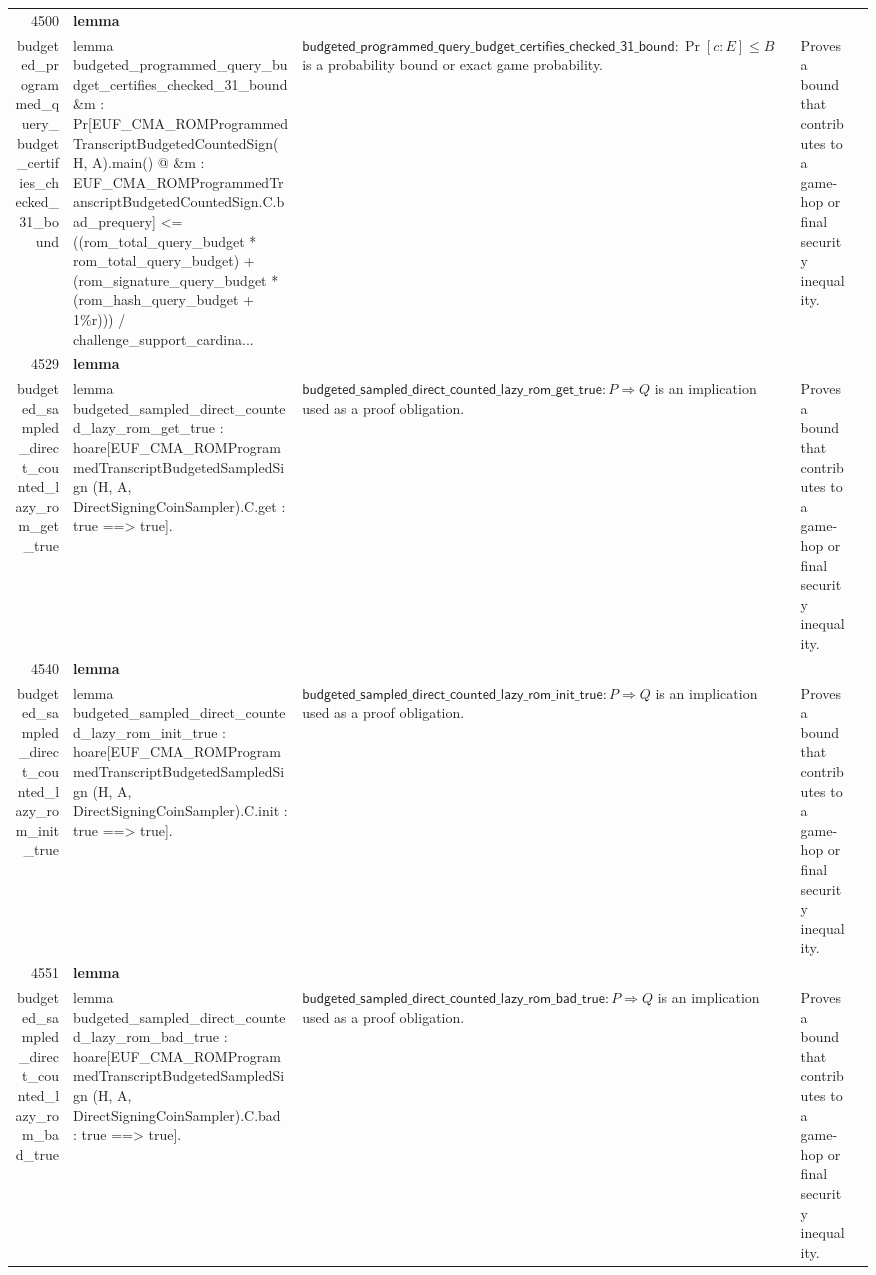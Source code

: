 \documentclass[10pt]{article}
\newcommand{\ec}[1]{\begingroup\ttfamily\scriptsize #1\endgroup}
\begin{document}
\begin{longtable}{r L{0.17\textwidth} L{0.26\textwidth} L{0.27\textwidth} L{0.20\textwidth}}
4500 & \textbf{lemma}\\\ec{budgeted\_programmed\_query\_budget\_certifies\_checked\_31\_bound} & \ec{lemma budgeted\_programmed\_query\_budget\_certifies\_checked\_31\_bound \&m : Pr[EUF\_CMA\_ROMProgrammedTranscriptBudgetedCountedSign(H, A).main() @ \&m : EUF\_CMA\_ROMProgrammedTranscriptBudgetedCountedSign.C.bad\_prequery] <= ((rom\_total\_query\_budget * rom\_total\_query\_budget) + (rom\_signature\_query\_budget * (rom\_hash\_query\_budget + 1\%r))) / challenge\_support\_cardina...} & \(\mathsf{budgeted\_programmed\_query\_budget\_certifies\_checked\_31\_bound} : \Pr[c : E] \le B\) is a probability bound or exact game probability. & Proves a bound that contributes to a game-hop or final security inequality. \\
4529 & \textbf{lemma}\\\ec{budgeted\_sampled\_direct\_counted\_lazy\_rom\_get\_true} & \ec{lemma budgeted\_sampled\_direct\_counted\_lazy\_rom\_get\_true : hoare[EUF\_CMA\_ROMProgrammedTranscriptBudgetedSampledSign (H, A, DirectSigningCoinSampler).C.get : true ==> true].} & \(\mathsf{budgeted\_sampled\_direct\_counted\_lazy\_rom\_get\_true} : P \Rightarrow Q\) is an implication used as a proof obligation. & Proves a bound that contributes to a game-hop or final security inequality. \\
4540 & \textbf{lemma}\\\ec{budgeted\_sampled\_direct\_counted\_lazy\_rom\_init\_true} & \ec{lemma budgeted\_sampled\_direct\_counted\_lazy\_rom\_init\_true : hoare[EUF\_CMA\_ROMProgrammedTranscriptBudgetedSampledSign (H, A, DirectSigningCoinSampler).C.init : true ==> true].} & \(\mathsf{budgeted\_sampled\_direct\_counted\_lazy\_rom\_init\_true} : P \Rightarrow Q\) is an implication used as a proof obligation. & Proves a bound that contributes to a game-hop or final security inequality. \\
4551 & \textbf{lemma}\\\ec{budgeted\_sampled\_direct\_counted\_lazy\_rom\_bad\_true} & \ec{lemma budgeted\_sampled\_direct\_counted\_lazy\_rom\_bad\_true : hoare[EUF\_CMA\_ROMProgrammedTranscriptBudgetedSampledSign (H, A, DirectSigningCoinSampler).C.bad : true ==> true].} & \(\mathsf{budgeted\_sampled\_direct\_counted\_lazy\_rom\_bad\_true} : P \Rightarrow Q\) is an implication used as a proof obligation. & Proves a bound that contributes to a game-hop or final security inequality. \\

\end{longtable}
\end{document}
